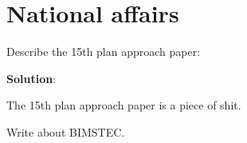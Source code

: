 \documentclass[
  openany]{book}
\newcommand{\question}{\item}
\newenvironment{solution}{ {\bfseries Solution}:}{}
\begin{document}
\hypertarget{national-affairs}{%
\section{National affairs}\label{national-affairs}}

\begin{questions}

\question Describe the 15th plan approach paper:

\begin{solution}

The 15th plan approach paper is a piece of shit.

\end{solution}

\question Write about BIMSTEC.

\end{questions}
\end{document}
